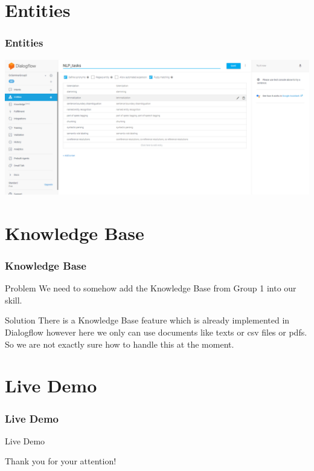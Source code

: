 \documentclass{beamer}
\begin{document}

\section{Entities}

\begin{frame}
\frametitle{Entities}
\begin{center}
\includegraphics[scale=0.23]{pictures/entities.png}
\end{center}
\end{frame}


\section{Knowledge Base}

\begin{frame}
\frametitle{Knowledge Base}
\begin{block}{Problem}
We need to somehow add the Knowledge Base from Group 1 into our skill.
\end{block}


\begin{block}{Solution}
There is a Knowledge Base feature which is already implemented in Dialogflow however here we only can use documents like texts or csv files or pdfs. So we are not exactly sure how to handle this at the moment.
\end{block}

\end{frame}


\section{Live Demo}

\begin{frame}
\frametitle{Live Demo}
\begin{center}
{\fontsize{30}{40}\selectfont Live Demo}
\end{center}
\end{frame}


\begin{frame}
\begin{center}
{\fontsize{30}{40}\selectfont Thank you for your attention!}
\end{center}
\end{frame}

\end{document}
